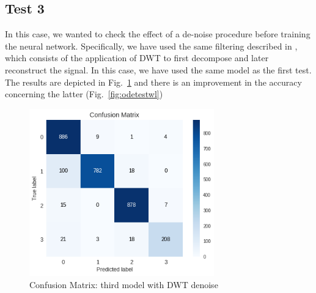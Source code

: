\documentclass[LaM,binding=0.6cm]{sapthesis}
\begin{document}
\subsection{Test 3}
In this case, we wanted to check the effect of a de-noise procedure before training the neural network. Specifically, we have used the same filtering described in \cite{svmnl}, which consists of the application of DWT to first decompose and later reconstruct the signal. In this case, we have used the same model as the first test. The results are depicted in Fig.~\ref{fig:odedwt} and there is an improvement in the accuracy concerning the latter (Fig.~\ref{fig:odetestwl}) 
\begin{figure}   \centering
    \includegraphics[width=80mm,scale=0.7]{odedwt.png}
    \caption{Confusion Matrix: third model with DWT denoise}
    \label{fig:odedwt}
\end{figure}
\end{document}
